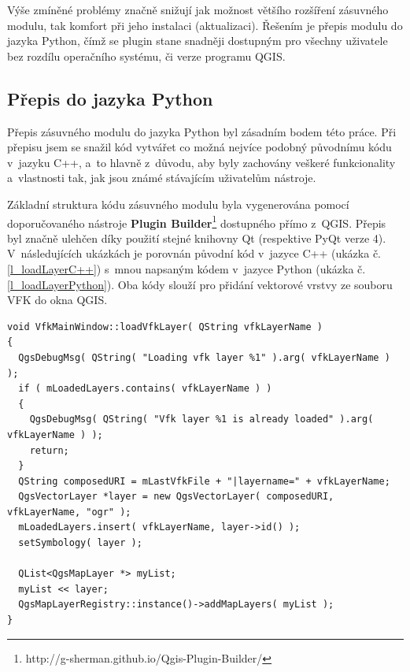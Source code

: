 \documentclass[a4paper,12pt,oneside]{book}
\begin{document}
Výše zmíněné problémy značně snižují jak možnost většího rozšíření
zásuvného modulu, tak komfort při jeho instalaci
(aktualizaci). Řešením je přepis modulu do jazyka Python, čímž se
plugin stane snadněji dostupným pro všechny uživatele bez rozdílu
operačního systému, či verze programu QGIS.

\subsection{Přepis do jazyka Python}
Přepis zásuvného modulu do jazyka Python byl zásadním bodem této
práce. Při přepisu jsem se snažil kód vytvářet co možná nejvíce
podobný původnímu kódu v~jazyku C++, a~to hlavně z~důvodu, aby byly
zachovány veškeré funkcionality a~vlastnosti tak, jak jsou známé
stávajícím uživatelům nástroje.

Základní struktura kódu zásuvného modulu byla vygenerována pomocí
doporučovaného nástroje \textbf{Plugin
  Builder}\footnote{http://g-sherman.github.io/Qgis-Plugin-Builder/}
dostupného přímo z~QGIS. Přepis byl značně ulehčen díky použití stejné
knihovny Qt (respektive PyQt verze 4). V~následujících ukázkách je
porovnán původní kód v~jazyce C++ (ukázka č. \ref{l_loadLayerC++})
s~mnou napsaným kódem v~jazyce Python (ukázka
č. \ref{l_loadLayerPython}). Oba kódy slouží pro přidání vektorové
vrstvy ze souboru VFK do okna QGIS.

\begin{lstlisting}[style=c++, 
		    caption=Kód pro načtení vektorové vrstvy v~C++, 
		    label=l_loadLayerC++]
 void VfkMainWindow::loadVfkLayer( QString vfkLayerName )
{
  QgsDebugMsg( QString( "Loading vfk layer %1" ).arg( vfkLayerName ) );
  if ( mLoadedLayers.contains( vfkLayerName ) )
  {
    QgsDebugMsg( QString( "Vfk layer %1 is already loaded" ).arg( vfkLayerName ) );
    return;
  }
  QString composedURI = mLastVfkFile + "|layername=" + vfkLayerName;
  QgsVectorLayer *layer = new QgsVectorLayer( composedURI, vfkLayerName, "ogr" );
  mLoadedLayers.insert( vfkLayerName, layer->id() );
  setSymbology( layer );

  QList<QgsMapLayer *> myList;
  myList << layer;
  QgsMapLayerRegistry::instance()->addMapLayers( myList );
}
\end{lstlisting}
\end{document}
